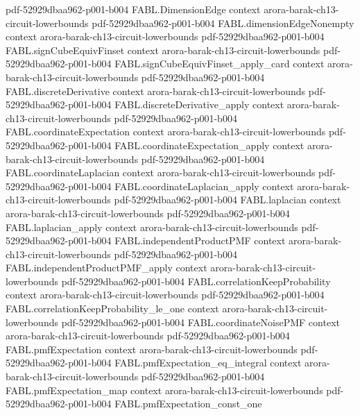 \begin{theorem}
  {pdf-52929dbaa962-p001-b004}
\proofstep
  {FABL.DimensionEdge}
  {context}
  {arora-barak-ch13-circuit-lowerbounds}
  {pdf-52929dbaa962-p001-b004}
\proofstep
  {FABL.dimensionEdgeNonempty}
  {context}
  {arora-barak-ch13-circuit-lowerbounds}
  {pdf-52929dbaa962-p001-b004}
\proofstep
  {FABL.signCubeEquivFinset}
  {context}
  {arora-barak-ch13-circuit-lowerbounds}
  {pdf-52929dbaa962-p001-b004}
\proofstep
  {FABL.signCubeEquivFinset_apply_card}
  {context}
  {arora-barak-ch13-circuit-lowerbounds}
  {pdf-52929dbaa962-p001-b004}
\proofstep
  {FABL.discreteDerivative}
  {context}
  {arora-barak-ch13-circuit-lowerbounds}
  {pdf-52929dbaa962-p001-b004}
\proofstep
  {FABL.discreteDerivative_apply}
  {context}
  {arora-barak-ch13-circuit-lowerbounds}
  {pdf-52929dbaa962-p001-b004}
\proofstep
  {FABL.coordinateExpectation}
  {context}
  {arora-barak-ch13-circuit-lowerbounds}
  {pdf-52929dbaa962-p001-b004}
\proofstep
  {FABL.coordinateExpectation_apply}
  {context}
  {arora-barak-ch13-circuit-lowerbounds}
  {pdf-52929dbaa962-p001-b004}
\proofstep
  {FABL.coordinateLaplacian}
  {context}
  {arora-barak-ch13-circuit-lowerbounds}
  {pdf-52929dbaa962-p001-b004}
\proofstep
  {FABL.coordinateLaplacian_apply}
  {context}
  {arora-barak-ch13-circuit-lowerbounds}
  {pdf-52929dbaa962-p001-b004}
\proofstep
  {FABL.laplacian}
  {context}
  {arora-barak-ch13-circuit-lowerbounds}
  {pdf-52929dbaa962-p001-b004}
\proofstep
  {FABL.laplacian_apply}
  {context}
  {arora-barak-ch13-circuit-lowerbounds}
  {pdf-52929dbaa962-p001-b004}
\proofstep
  {FABL.independentProductPMF}
  {context}
  {arora-barak-ch13-circuit-lowerbounds}
  {pdf-52929dbaa962-p001-b004}
\proofstep
  {FABL.independentProductPMF_apply}
  {context}
  {arora-barak-ch13-circuit-lowerbounds}
  {pdf-52929dbaa962-p001-b004}
\proofstep
  {FABL.correlationKeepProbability}
  {context}
  {arora-barak-ch13-circuit-lowerbounds}
  {pdf-52929dbaa962-p001-b004}
\proofstep
  {FABL.correlationKeepProbability_le_one}
  {context}
  {arora-barak-ch13-circuit-lowerbounds}
  {pdf-52929dbaa962-p001-b004}
\proofstep
  {FABL.coordinateNoisePMF}
  {context}
  {arora-barak-ch13-circuit-lowerbounds}
  {pdf-52929dbaa962-p001-b004}
\proofstep
  {FABL.pmfExpectation}
  {context}
  {arora-barak-ch13-circuit-lowerbounds}
  {pdf-52929dbaa962-p001-b004}
\proofstep
  {FABL.pmfExpectation_eq_integral}
  {context}
  {arora-barak-ch13-circuit-lowerbounds}
  {pdf-52929dbaa962-p001-b004}
\proofstep
  {FABL.pmfExpectation_map}
  {context}
  {arora-barak-ch13-circuit-lowerbounds}
  {pdf-52929dbaa962-p001-b004}
\proofstep
  {FABL.pmfExpectation_const_one}

\end{theorem}
